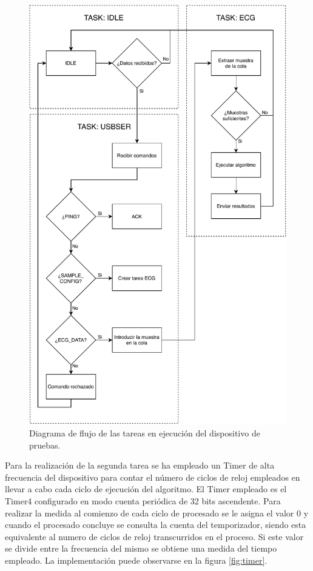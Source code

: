         \begin{figure}
                \centering
                        \includegraphics[width = 0.78 \linewidth]{figuras/TivaWorkFlow.pdf}
                \caption{Diagrama de flujo de las tareas en ejecución del dispositivo de pruebas.}
                \label{fig:tivaFlow}
        \end{figure}
        
        Para la realización de la segunda tarea se ha empleado un Timer de alta frecuencia del dispositivo para contar el número de ciclos de reloj empleados en llevar a cabo cada ciclo de ejecución del algoritmo. El Timer empleado es el Timer4 configurado en modo cuenta periódica de 32 bits ascendente. Para realizar la medida al comienzo de cada ciclo de procesado se le asigna el valor 0 y cuando el procesado concluye se consulta la cuenta del temporizador, siendo esta equivalente al numero de ciclos de reloj transcurridos en el proceso. Si este valor se divide entre la frecuencia del mismo se obtiene una medida del tiempo empleado. La implementación puede observarse en la figura \ref{fig:timer}.
        
